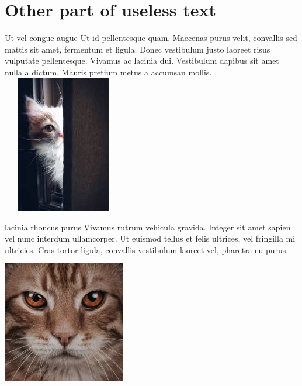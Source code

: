 \documentclass{beamer}
\begin{document}
\section {Other part of useless text}
    \begin{frame}{Ut vel congue augue}
        Ut id pellentesque quam. Maecenas purus velit, convallis sed mattis sit amet, fermentum et ligula. Donec vestibulum justo laoreet risus vulputate pellentesque. Vivamus ac lacinia dui. Vestibulum dapibus sit amet nulla a dictum. Mauris pretium metus a accumsan mollis. \\
        \includegraphics[width=0.4\textwidth, height=60mm]{images/6.jpg}
    \end{frame}
    
    \begin{frame}{lacinia rhoncus purus}
        Vivamus rutrum vehicula gravida. Integer sit amet sapien vel nunc interdum ullamcorper. Ut euismod tellus et felis ultrices, vel fringilla mi ultricies. Cras tortor ligula, convallis vestibulum laoreet vel, pharetra eu purus. \\
        \includegraphics[width=0.4\textwidth, height=60mm]{images/7.jpg}
    
    \end{frame}
\end{document}
